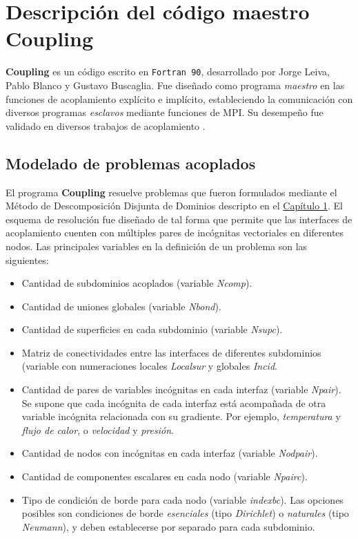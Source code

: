 \chapter{Descripción del código maestro \textbf{Coupling}}
\label{C:coupling}

\textbf{Coupling} es un código escrito en \texttt{Fortran 90}, desarrollado por Jorge Leiva, Pablo Blanco y Gustavo Buscaglia.
Fue diseñado como programa \textit{maestro} en las funciones de acoplamiento explícito e implícito,
estableciendo la comunicación con diversos programas \textit{esclavos} mediante funciones de MPI.
Su desempeño fue validado en diversos trabajos de acoplamiento \cite{coup-0d3d} \cite{coup-black} \cite{coup-hyd} \cite{coup-strong}.

\section{Modelado de problemas acoplados}
\label{ap1:definicion}
El programa \textbf{Coupling} resuelve problemas que fueron formulados mediante el Método de Descomposición Disjunta de Dominios descripto en el \hyperlink{chapter.1}{Capítulo 1}.
El esquema de resolución fue diseñado de tal forma que permite que las interfaces de acoplamiento cuenten con múltiples pares de incógnitas vectoriales en diferentes nodos.
Las principales variables en la definición de un problema son las siguientes:
\begin{itemize}
\item Cantidad de subdominios acoplados (variable \textit{Ncomp}).
\item Cantidad de uniones globales (variable \textit{Nbond}).
\item Cantidad de superficies en cada subdominio (variable \textit{Nsupc}).
\item Matriz de conectividades entre las interfaces de diferentes subdominios (variable con numeraciones locales \textit{Localsur} y globales \textit{Incid}.
\item Cantidad de pares de variables incógnitas en cada interfaz (variable \textit{Npair}).
Se supone que cada incógnita de cada interfaz está acompañada de otra variable incógnita relacionada con su gradiente.
Por ejemplo, \textit{temperatura} y \textit{flujo de calor}, o \textit{velocidad} y \textit{presión}.
\item Cantidad de nodos con incógnitas en cada interfaz (variable \textit{Nodpair}).
\item Cantidad de componentes escalares en cada nodo (variable \textit{Npairc}).
\item Tipo de condición de borde para cada nodo (variable \textit{indexbc}).
Las opciones posibles son condiciones de borde \textit{esenciales} (tipo \textit{Dirichlet}) o \textit{naturales} (tipo \textit{Neumann}), y deben establecerse por separado para cada subdominio.
\end{itemize}
